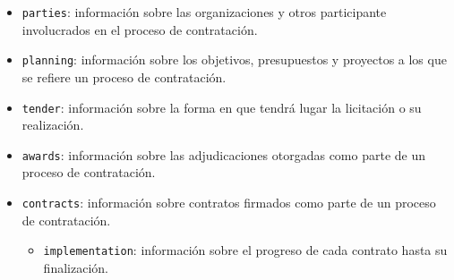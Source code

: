             \begin{itemize}
                \item \texttt{parties}: información sobre las organizaciones y otros participante involucrados en el proceso de contratación.
                \item \texttt{planning}: información sobre los objetivos, presupuestos y proyectos a los que se refiere un proceso de contratación.
                \item \texttt{tender}: información sobre la forma en que tendrá lugar la licitación o su realización.
                \item \texttt{awards}: información sobre las adjudicaciones otorgadas como parte de un proceso de contratación.
                \item \texttt{contracts}: información sobre contratos firmados como parte de un proceso de contratación.
                \begin{itemize}
                    \item \texttt{implementation}: información sobre el progreso de cada contrato hasta su finalización.
                \end{itemize}
            \end{itemize}
            
\newpage